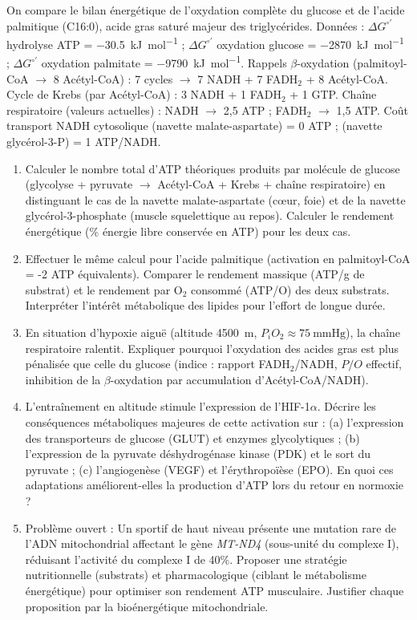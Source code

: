 \documentclass[11pt]{article}
\begin{document}
\begin{exercice}
On compare le bilan énergétique de l'oxydation complète du glucose et de l'acide palmitique (C16:0), acide gras saturé majeur des triglycérides. Données : $\Delta G^{\circ'}$ hydrolyse ATP = \SI{-30,5}{\kilo\joule.mol^{-1}} ; $\Delta G^{\circ'}$ oxydation glucose = \SI{-2870}{\kilo\joule.mol^{-1}} ; $\Delta G^{\circ'}$ oxydation palmitate = \SI{-9790}{\kilo\joule.mol^{-1}}.
Rappels $\beta$-oxydation (palmitoyl-CoA $\rightarrow$ 8 Acétyl-CoA) : 7 cycles $\rightarrow$ 7 NADH + 7 FADH$_2$ + 8 Acétyl-CoA.
Cycle de Krebs (par Acétyl-CoA) : 3 NADH + 1 FADH$_2$ + 1 GTP.
Chaîne respiratoire (valeurs actuelles) : NADH $\rightarrow$ 2,5 ATP ; FADH$_2$ $\rightarrow$ 1,5 ATP. Coût transport NADH cytosolique (navette malate-aspartate) = 0 ATP ; (navette glycérol-3-P) = 1 ATP/NADH.

\begin{enumerate}
\item Calculer le nombre total d'ATP théoriques produits par molécule de glucose (glycolyse + pyruvate $\rightarrow$ Acétyl-CoA + Krebs + chaîne respiratoire) en distinguant le cas de la navette malate-aspartate (cœur, foie) et de la navette glycérol-3-phosphate (muscle squelettique au repos). Calculer le rendement énergétique (\% énergie libre conservée en ATP) pour les deux cas.
\item Effectuer le même calcul pour l'acide palmitique (activation en palmitoyl-CoA = -2 ATP équivalents). Comparer le rendement massique (ATP/g de substrat) et le rendement par O$_2$ consommé (ATP/O) des deux substrats. Interpréter l'intérêt métabolique des lipides pour l'effort de longue durée.
\item En situation d'hypoxie aiguë (altitude \SI{4500}{\meter}, $P_{i}O_2 \approx \SI{75}{\mmHg}$), la chaîne respiratoire ralentit. Expliquer pourquoi l'oxydation des acides gras est plus pénalisée que celle du glucose (indice : rapport FADH$_2$/NADH, $P/O$ effectif, inhibition de la $\beta$-oxydation par accumulation d'Acétyl-CoA/NADH).
\item L'entraînement en altitude stimule l'expression de l'HIF-1$\alpha$. Décrire les conséquences métaboliques majeures de cette activation sur : (a) l'expression des transporteurs de glucose (GLUT) et enzymes glycolytiques ; (b) l'expression de la pyruvate déshydrogénase kinase (PDK) et le sort du pyruvate ; (c) l'angiogenèse (VEGF) et l'érythropoïèse (EPO). En quoi ces adaptations améliorent-elles la production d'ATP lors du retour en normoxie ?
\item Problème ouvert : Un sportif de haut niveau présente une mutation rare de l'ADN mitochondrial affectant le gène \textit{MT-ND4} (sous-unité du complexe I), réduisant l'activité du complexe I de 40\%. Proposer une stratégie nutritionnelle (substrats) et pharmacologique (ciblant le métabolisme énergétique) pour optimiser son rendement ATP musculaire. Justifier chaque proposition par la bioénergétique mitochondriale.
\end{enumerate}
\end{exercice}
\end{document}
